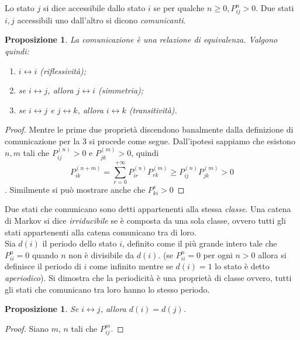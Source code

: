 \documentclass{article}
\begin{document}
Lo stato $j$ si dice accessibile dallo stato $i$ se per qualche $n \ge 0, P_{ij}^n > 0$. Due stati $i, j$ accessibili uno dall'altro si dicono \textit{comunicanti}.\\ 

\newtheorem{Prop4.2.1}{Proposizione}
\begin{Prop4.2.1}
La comunicazione è una relazione di equivalenza. Valgono quindi:
\begin{enumerate}
    \item $i \leftrightarrow i$ (riflessività);
    \item se $i \leftrightarrow j$, allora $j \leftrightarrow i$ (simmetria);
    \item se $i \leftrightarrow j$ e $j \leftrightarrow k$, allora $i \leftrightarrow k$ (transitività).
\end{enumerate}
\end{Prop4.2.1}

\begin{proof}
Mentre le prime due proprietà discendono banalmente dalla definizione di comunicazione per la $3$ si procede come segue. Dall'ipotesi sappiamo che esistono $n, m$ tali che $P_{ij}^{(n)} > 0$ e $P_{jk}^{(m)} > 0$, quindi 
\[P_{ik}^{(n+m)} = \sum_{r = 0}^{+\infty}P_{ir}^{(n)}P_{rk}^{(m)} \ge P_{ij}^{(n)}P_{jk}^{(m)} > 0\]. Similmente si può mostrare anche che $P_{ki}^s > 0$
\end{proof}

Due stati che comunicano sono detti appartenenti alla stessa \textit{classe}. Una catena di Markov si dice \textit{irriducibile} se è composta da una sola classe, ovvero tutti gli stati appartenenti alla catena comunicano tra di loro.\\

Sia $d(i)$ il periodo dello stato $i$, definito come il più grande intero tale che $P_{ii}^n=0$ quando $n$ non è divisibile da $d(i)$. (se $P_{ii}^n = 0$ per ogni $n > 0$ allora si definisce il periodo di $i$ come infinito mentre se $d(i) = 1$ lo stato è detto \textit{aperiodico}). Si dimostra che la periodicità è una proprietà di classe ovvero, tutti gli stati che comunicano tra loro hanno lo stesso periodo.

\newtheorem{Prop4.2.2}{Proposizione}
\begin{Prop4.2.2}
Se $i \leftrightarrow j$, allora $d(i) = d(j)$.
\end{Prop4.2.2}

\begin{proof}
Siano $m$, $n$ tali che $P_{ij}^m$.
\end{proof}
\end{document}
